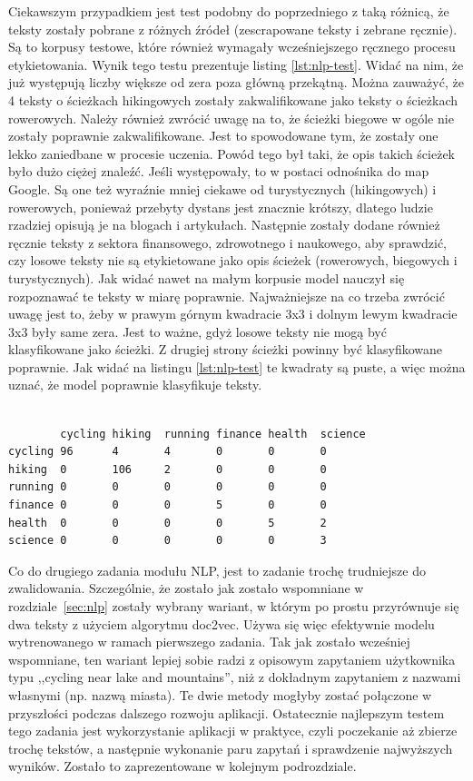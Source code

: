 \documentclass[titlepage]{article}
\begin{document}
Ciekawszym przypadkiem jest test podobny do poprzedniego z taką różnicą, że teksty zostały pobrane z różnych źródeł (zescrapowane teksty i zebrane ręcznie). Są to korpusy testowe, które również wymagały wcześniejszego ręcznego procesu etykietowania. Wynik tego testu prezentuje listing \ref{lst:nlp-test}. Widać na nim, że już występują liczby większe od zera poza główną przekątną. Można zauważyć, że 4 teksty o ścieżkach hikingowych zostały zakwalifikowane jako teksty o ścieżkach rowerowych. Należy również zwrócić uwagę na to, że ścieżki biegowe w ogóle nie zostały poprawnie zakwalifikowane. Jest to spowodowane tym, że zostały one lekko zaniedbane w procesie uczenia. Powód tego był taki, że opis takich ścieżek było dużo ciężej znaleźć. Jeśli występowały, to w postaci odnośnika do map Google. Są one też wyraźnie mniej ciekawe od turystycznych (hikingowych) i rowerowych, ponieważ przebyty dystans jest znacznie krótszy, dlatego ludzie rzadziej opisują je na blogach i artykułach. Następnie zostały dodane również ręcznie teksty z sektora finansowego, zdrowotnego i naukowego, aby sprawdzić, czy losowe teksty nie są etykietowane jako opis ścieżek (rowerowych, biegowych i turystycznych). Jak widać nawet na małym korpusie model nauczył się rozpoznawać te teksty w miarę poprawnie. Najważniejsze na co trzeba zwrócić uwagę jest to, żeby w prawym górnym kwadracie 3x3 i dolnym lewym kwadracie 3x3 były same zera. Jest to ważne, gdyż losowe teksty nie mogą być klasyfikowane jako ścieżki. Z drugiej strony ścieżki powinny być klasyfikowane poprawnie. Jak widać na listingu \ref{lst:nlp-test} te kwadraty są puste, a więc można uznać, że model poprawnie klasyfikuje teksty.

\begin{lstlisting}[frame=single,
stepnumber=1,
numbersep=10pt,
tabsize=4,
showspaces=false,
showstringspaces=false,
label=lst:nlp-test,
caption=Wynik testu dla tekstów testowych]

		cycling	hiking	running	finance	health	science	
cycling	96		4		4		0		0		0		
hiking	0		106		2		0		0		0		
running	0		0		0		0		0		0		
finance	0		0		0		5		0		0		
health	0		0		0		0		5		2		
science	0		0		0		0		0		3		
\end{lstlisting}

Co do drugiego zadania modułu NLP, jest to zadanie trochę trudniejsze do zwalidowania. Szczególnie, że zostało jak zostało wspomniane w rozdziale~\ref{sec:nlp} zostały wybrany wariant, w którym po prostu przyrównuje się dwa teksty z użyciem algorytmu doc2vec. Używa się więc efektywnie modelu wytrenowanego w ramach pierwszego zadania. Tak jak zostało wcześniej wspomniane, ten wariant lepiej sobie radzi z opisowym zapytaniem użytkownika typu ,,cycling near lake and mountains'', niż z dokładnym zapytaniem z nazwami własnymi (np. nazwą miasta). Te dwie metody mogłyby zostać połączone w przyszłości podczas dalszego rozwoju aplikacji. Ostatecznie najlepszym testem tego zadania jest wykorzystanie aplikacji w praktyce, czyli poczekanie aż zbierze trochę tekstów, a następnie wykonanie paru zapytań i sprawdzenie najwyższych wyników. Zostało to zaprezentowane w kolejnym podrozdziale.
\end{document}
